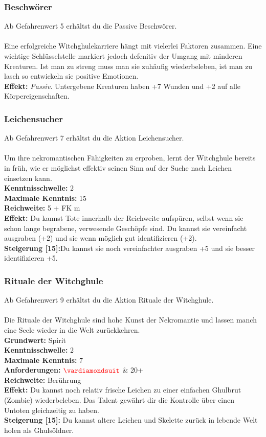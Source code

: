 \subsubsection*{ Beschwörer} \label{sk:beschwoerer}
Ab Gefahrenwert 5 erhältst du die Passive Beschwörer.\\
\\
Eine erfolgreiche Witchghulekarriere hängt mit vielerlei Faktoren zusammen. Eine wichtige Schlüsselstelle markiert jedoch defenitiv der Umgang mit minderen Kreaturen. Ist man zu streng muss man sie zuhäufig wiederbeleben, ist man zu lasch so entwickeln sie positive Emotionen. \\
\textbf{Effekt:} \textit{Passiv.} Untergebene Kreaturen haben +7 Wunden und +2 auf alle Körpereigenschaften.

\subsubsection*{ Leichensucher} \label{sk:leichensucher}
Ab Gefahrenwert 7 erhältst du die Aktion Leichensucher.\\
\\
Um ihre nekromantischen Fähigkeiten zu erproben, lernt der Witchghule bereits in früh, wie er möglichst effektiv seinen Sinn auf der Suche nach Leichen einsetzen kann. \\
\textbf{Kenntnisschwelle:} 2 \\
\textbf{Maximale Kenntnis:} 15 \\
\textbf{Reichweite:} 5 + FK m \\
\textbf{Effekt:} Du kannst Tote innerhalb der Reichweite aufspüren, selbst wenn sie schon lange begrabene, verwesende Geschöpfe sind. Du kannst sie vereinfacht ausgraben (+2) und sie wenn möglich gut identifizieren (+2).\\
\textbf{Steigerung [15]:}Du kannst sie noch vereinfachter ausgraben +5 und sie besser identifizieren +5.

\subsubsection*{ Rituale der Witchghule} \label{sk:ritualederwitchghule}
Ab Gefahrenwert 9 erhältst du die Aktion Rituale der Witchghule.\\
\\
Die Rituale der Witchghule sind hohe Kunst der Nekromantie und lassen manch eine Seele wieder in die Welt zurückkehren. \\
\textbf{Grundwert:} Spirit \\
\textbf{Kenntnisschwelle:} 2 \\
\textbf{Maximale Kenntnis:} 7 \\
\textbf{Anforderungen:} $\Karo{}$ \& 20+ \\
\textbf{Reichweite:} Berührung \\
\textbf{Effekt:} Du kannst noch relativ frische Leichen zu einer einfachen Ghulbrut (Zombie) wiederbeleben. Das Talent gewährt dir die Kontrolle über einen Untoten gleichzeitig zu haben.\\
\textbf{Steigerung [15]:} Du kannst altere Leichen und Skelette zurück in lebende Welt holen als Ghulsöldner.

